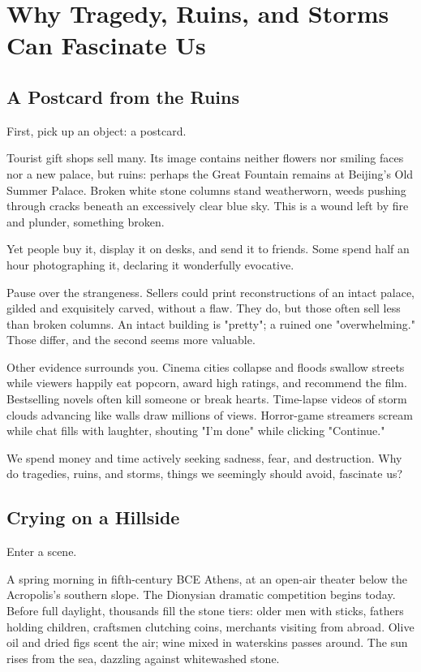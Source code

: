 \chapter[Tragedy, Ruins, and Storms]{Why Tragedy, Ruins, and Storms Can Fascinate Us}
\section{A Postcard from the Ruins}
First, pick up an object: a postcard.

Tourist gift shops sell many. Its image contains neither flowers nor smiling faces nor a new palace, but ruins: perhaps the Great Fountain remains at Beijing's Old Summer Palace. Broken white stone columns stand weatherworn, weeds pushing through cracks beneath an excessively clear blue sky. This is a wound left by fire and plunder, something broken.

Yet people buy it, display it on desks, and send it to friends. Some spend half an hour photographing it, declaring it wonderfully evocative.

Pause over the strangeness. Sellers could print reconstructions of an intact palace, gilded and exquisitely carved, without a flaw. They do, but those often sell less than broken columns. An intact building is "pretty"; a ruined one "overwhelming." Those differ, and the second seems more valuable.

Other evidence surrounds you. Cinema cities collapse and floods swallow streets while viewers happily eat popcorn, award high ratings, and recommend the film. Bestselling novels often kill someone or break hearts. Time-lapse videos of storm clouds advancing like walls draw millions of views. Horror-game streamers scream while chat fills with laughter, shouting "I'm done" while clicking "Continue."

We spend money and time actively seeking sadness, fear, and destruction. Why do tragedies, ruins, and storms, things we seemingly should avoid, fascinate us?

\section{Crying on a Hillside}
Enter a scene.

A spring morning in fifth-century BCE Athens, at an open-air theater below the Acropolis's southern slope. The Dionysian dramatic competition begins today. Before full daylight, thousands fill the stone tiers: older men with sticks, fathers holding children, craftsmen clutching coins, merchants visiting from abroad. Olive oil and dried figs scent the air; wine mixed in waterskins passes around. The sun rises from the sea, dazzling against whitewashed stone.

